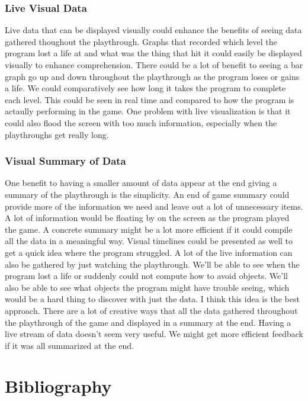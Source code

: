 \subsection{Live Visual Data}
Live data that can be displayed visually could enhance the benefits of seeing data gathered thoughout the playthrough.
Graphs that recorded which level the program lost a life at and what was the thing that hit it could easily be displayed visually to enhance comprehension.
There could be a lot of benefit to seeing a bar graph go up and down throughout the playthrough as the program loses or gains a life.
We could comparatively see how long it takes the program to complete each level.
This could be seen in real time and compared to how the program is actaully performing in the game.
One problem with live visualization is that it could also flood the screen with too much information, especially when the playthroughs get really long.

\subsection{Visual Summary of Data}
One benefit to having a smaller amount of data appear at the end giving a summary of the playthrough is the simplicity.
An end of game summary could provide more of the information we need and leave out a lot of unnecessary items.
A lot of information would be floating by on the screen as the program played the game.
A concrete summary might be a lot more efficient if it could compile all the data in a meaningful way.
Visual timelines could be presented as well to get a quick idea where the program struggled.
A lot of the live information can also be gathered by just watching the playthrough.
We'll be able to see when the program lost a life or suddenly could not compute how to avoid objects.
We'll also be able to see what objects the program might have trouble seeing, which would be a hard thing to discover with just the data.
I think this idea is the best approach.
There are a lot of creative ways that all the data gathered throughout the playthrough of the game and displayed in a summary at the end.
Having a live stream of data doesn't seem very useful.
We might get more efficient feedback if it was all summarized at the end.





\chapter{Bibliography}

